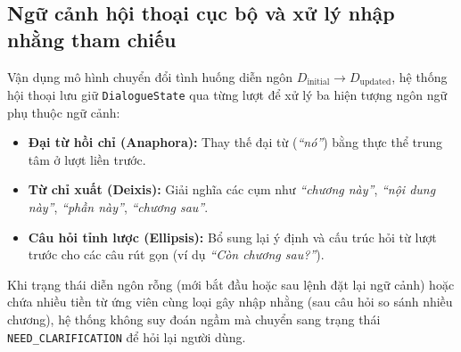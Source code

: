 \subsection{Ngữ cảnh hội thoại cục bộ và xử lý nhập nhằng tham chiếu}

Vận dụng mô hình chuyển đổi tình huống diễn ngôn $D_{\text{initial}} \rightarrow D_{\text{updated}}$, hệ thống hội thoại lưu giữ \texttt{DialogueState} qua từng lượt để xử lý ba hiện tượng ngôn ngữ phụ thuộc ngữ cảnh:
\begin{itemize}
  \item \textbf{Đại từ hồi chỉ (Anaphora):} Thay thế đại từ (\emph{``nó''}) bằng thực thể trung tâm ở lượt liền trước.
  \item \textbf{Từ chỉ xuất (Deixis):} Giải nghĩa các cụm như \emph{``chương này''}, \emph{``nội dung này''}, \emph{``phần này''}, \emph{``chương sau''}.
  \item \textbf{Câu hỏi tỉnh lược (Ellipsis):} Bổ sung lại ý định và cấu trúc hỏi từ lượt trước cho các câu rút gọn (ví dụ \emph{``Còn chương sau?''}).
\end{itemize}
Khi trạng thái diễn ngôn rỗng (mới bắt đầu hoặc sau lệnh đặt lại ngữ cảnh) hoặc chứa nhiều tiền từ ứng viên cùng loại gây nhập nhằng (sau câu hỏi so sánh nhiều chương), hệ thống không suy đoán ngầm mà chuyển sang trạng thái \texttt{NEED\_CLARIFICATION} để hỏi lại người dùng.
